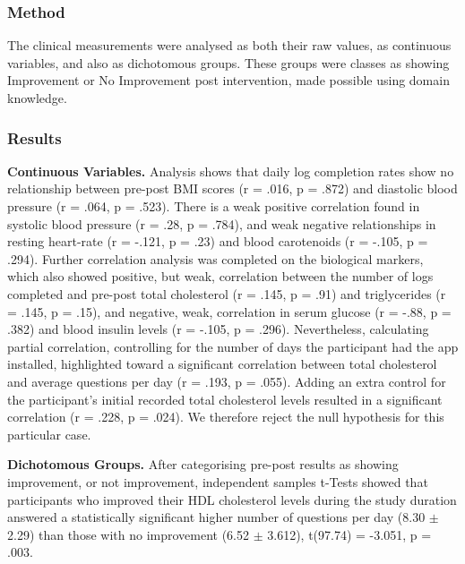 \subsubsection{Method}
The clinical measurements were analysed as both their raw values, as continuous variables, and also as dichotomous groups. These groups were classes as showing Improvement or No Improvement post intervention, made possible using domain knowledge.

\subsubsection{Results}

\textbf{Continuous Variables.}
Analysis shows that daily log completion rates show no relationship between pre-post BMI scores (r = .016, p = .872) and diastolic blood pressure (r = .064, p = .523). There is a weak positive correlation found in systolic blood pressure (r = .28, p = .784), and weak negative relationships in resting heart-rate (r = -.121, p = .23) and blood carotenoids (r = -.105, p = .294). Further correlation analysis was completed on the biological markers, which also showed positive, but weak, correlation between the number of logs completed and pre-post total cholesterol (r = .145, p = .91) and triglycerides (r = .145, p = .15), and negative, weak, correlation in serum glucose (r = -.88, p = .382) and blood insulin levels (r = -.105, p = .296).
Nevertheless, calculating partial correlation, controlling for the number of days the participant had the app installed, highlighted toward a significant correlation between total cholesterol and average questions per day (r = .193, p = .055). Adding an extra control for the participant’s initial recorded total cholesterol levels resulted in a significant correlation (r = .228, p = .024). We therefore reject the null hypothesis for this particular case.

\textbf{Dichotomous Groups.}
After categorising pre-post results as showing improvement, or not improvement, independent samples t-Tests showed that participants who improved their HDL cholesterol levels during the study duration answered a statistically significant higher number of questions per day (8.30 $\pm$ 2.29) than those with no improvement (6.52 $\pm$ 3.612), t(97.74) = -3.051, p = .003.

